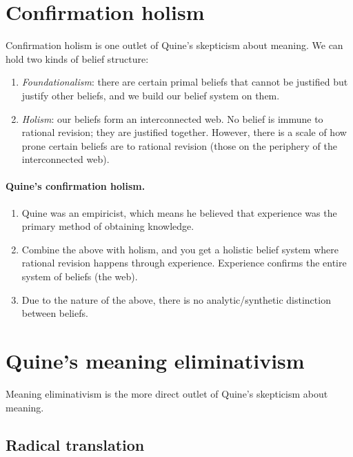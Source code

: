 \section{Confirmation holism}

Confirmation holism is one outlet of Quine's skepticism about meaning. We can hold two kinds of belief structure:

\begin{definition}\leavevmode
\begin{enumerate}
  \item \emph{Foundationalism}: there are certain primal beliefs that cannot be justified but justify other beliefs, and we build our belief system on them.
  \item \emph{Holism}: our beliefs form an interconnected web. No belief is immune to rational revision; they are justified together. However, there is a scale of how prone certain beliefs are to rational revision (those on the periphery of the interconnected web).
\end{enumerate}
\end{definition}

\paragraph{Quine's confirmation holism.}
\begin{enumerate}
  \item Quine was an empiricist, which means he believed that experience was the primary method of obtaining knowledge.
  \item Combine the above with holism, and you get a holistic belief system where rational revision happens through experience. Experience confirms the entire system of beliefs (the web).
  \item Due to the nature of the above, there is no analytic/synthetic distinction between beliefs.
\end{enumerate}

\section{Quine's meaning eliminativism}

Meaning eliminativism is the more direct outlet of Quine's skepticism about meaning.

\subsection{Radical translation}

